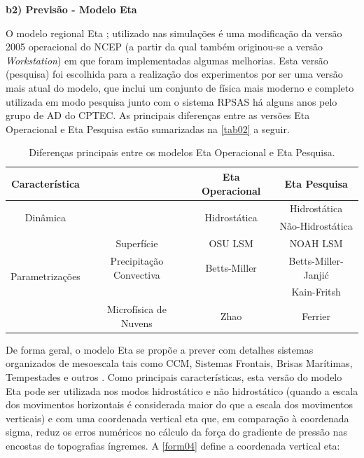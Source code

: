 \textbf{b2) Previsão - Modelo Eta}

O modelo regional Eta \cite{mesingeretal88}; \cite{black94} utilizado nas simulações é uma modificação da versão 2005 operacional do NCEP (a partir da qual também originou-se a versão \textit{Workstation}) em que foram implementadas algumas melhorias. Esta versão (pesquisa) foi escolhida para a realização dos experimentos por ser uma versão mais atual do modelo, que inclui um conjunto de física mais moderno e completo utilizada em modo pesquisa junto com o sistema RPSAS há alguns anos pelo grupo de AD do CPTEC. As principais diferenças entre as versões Eta Operacional e Eta Pesquisa estão sumarizadas na \autoref{tab02} a seguir.

\begin{table}[!hbp]
\caption{Diferenças principais entre os modelos Eta Operacional e Eta Pesquisa.}
\label{tab02}
\centering
\begin{tabular}{c|c|c|c}
\hline
Característica                       &                         & Eta Operacional              & Eta Pesquisa          \\
\hline
\multirow{2}{2.8cm}{Dinâmica}        &                         & \multirow{2}{2.8cm}{Hidrostática}      & Hidrostática       \\
                                     &                         &                   & Não-Hidrostática   \\
\hline
                                     & Superfície              & OSU LSM\footnotemark[1]          & NOAH LSM\footnotemark[2]          \\ 
\multirow{2}{2.8cm}{Parametrizações} & Precipitação Convectiva & Betts-Miller      & Betts-Miller-Janjić\\
                                     &                         &                   & Kain-Fritsh        \\
                                     & Microfísica de Nuvens   & Zhao              & Ferrier            \\
\hline
\end{tabular}
\end{table}


De forma geral, o modelo Eta se propõe a prever com detalhes sistemas organizados de mesoescala tais como CCM, Sistemas Frontais, Brisas Marítimas, Tempestades e outros \cite{chou96}. Como principais características, esta versão do modelo Eta pode ser utilizada nos modos hidrostático e não hidrostático (quando a escala dos movimentos horizontais é considerada maior do que a escala dos movimentos verticais) e com uma coordenada vertical eta que, em comparação à coordenada sigma, reduz os erros numéricos no cálculo da força do gradiente de pressão nas encostas de topografias íngremes. A \autoref{form04} define a coordenada vertical eta:

